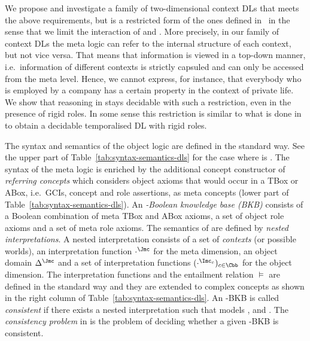 \documentclass[final]{scrartcl}
\begin{document}
We propose and investigate a family of two-dimensional context DLs \LMLO that
meets the above requirements, but is a restricted form of the ones defined in~\cite{KG-JELIA10} in
the sense that we limit the interaction of \LM and \LO.  More precisely, in our family of
context DLs the meta logic can refer to the internal structure of each context, but not vice versa.
That means that information is viewed in a top-down manner, i.e.~information of different contexts
is strictly capsuled and can only be accessed from the meta level.  Hence, we cannot
express, for instance, that everybody who is employed by a company has a certain property in the
context of private life.  We show that reasoning in \LMLO stays decidable with
such a restriction, even in the presence of rigid roles.
%
In some sense this restriction is similar to what is done in~\cite{BaGL-KR08,BaGL-ToCL12,Lip-PhD14}
to obtain a decidable temporalised DL with rigid roles.  

\tableSyntaxSemanticsLMLO

The syntax and semantics of the object logic \LO are defined in the standard way. See the upper part
of Table~\ref{tab:syntax-semantics-dls} for the case where \LO is \SHOIQ.
%
The syntax of the meta logic \LM is enriched by the additional concept constructor of
\emph{referring concepts} which considers object axioms that would occur in a TBox or ABox, i.e.\
GCIs, concept and role assertions, as meta concepts (lower part of
Table~\ref{tab:syntax-semantics-dls}). An \emph{\LMLO-Boolean knowledge base (BKB)} consists of a
Boolean combination \Bmc of meta TBox and ABox axioms, a set \RO of object role axioms and a set \RM
of meta role axioms.
%
The semantics of \LMLO are defined by \emph{nested interpretations}. A nested interpretation \JJ
consists of a set \Cbb of \emph{contexts} (or possible worlds), an interpretation function
$\cdot^{\J}$ for the meta dimension, an object domain $\Delta^{\J}$ and a set of interpretation
functions $(\cdot^{\I_{c}})_{c\in\Cbb}$ for the object dimension. The interpretation functions and
the entailment relation $\models$ are defined in the standard way and they are extended to complex
concepts as shown in the right column of Table~\ref{tab:syntax-semantics-dls}. An \LMLO-BKB is
called \emph{consistent} if there exists a nested interpretation \J such that \J models \Bmc, \RM
and \RO. The \emph{consistency problem} in \LMLO is the problem of deciding whether a given
\LMLO-BKB is consistent.
\end{document}
